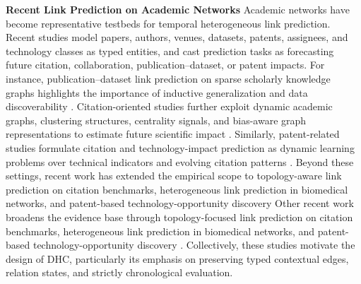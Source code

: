 \textbf{Recent Link Prediction on Academic Networks}
Academic networks have become representative testbeds for temporal heterogeneous link prediction. 
Recent studies model papers, authors, venues, datasets, patents, assignees, and technology classes as typed entities, and cast prediction tasks as forecasting future citation, collaboration, publication--dataset, or patent impacts. 
For instance, publication--dataset link prediction on sparse scholarly knowledge graphs highlights the importance of inductive generalization and data discoverability \cite{irrera2025heterogeneous}.
Citation-oriented studies further exploit dynamic academic graphs, clustering structures, centrality signals, and bias-aware graph representations to estimate future scientific impact \cite{zhang2025cdchgn,lu2026bacite}.
Similarly, patent-related studies formulate citation and technology-impact prediction as dynamic learning problems over technical indicators and evolving citation patterns \cite{seol2026patentcitation}.
Beyond these settings, recent work has extended the empirical scope to topology-aware link prediction on citation benchmarks, heterogeneous link prediction in biomedical networks, and patent-based technology-opportunity discovery \cite{hu2025biomedicalhgnn,wu2026identifying,liang2026tagnn}
Other recent work broadens the evidence base through topology-focused link prediction on citation benchmarks, heterogeneous link prediction in biomedical networks, and patent-based technology-opportunity discovery \cite{hu2025biomedicalhgnn,wu2026identifying,liang2026tagnn}. 
Collectively, these studies motivate the design of DHC, particularly its emphasis on preserving typed contextual edges, relation states, and strictly chronological evaluation.
